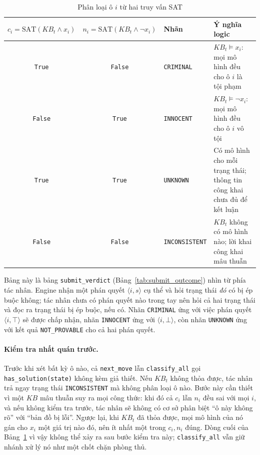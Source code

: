 \begin{sloppypar}
\begin{table}[htbp]
  \centering\small
  \caption{Phân loại ô $i$ từ hai truy vấn SAT}
  \label{tab:entailment_classification}
  \begin{tabularx}{\textwidth}{ccl>{\raggedright\arraybackslash}X}
    \toprule
    $c_i = \mathrm{SAT}(\mathit{KB}_t \land x_i)$
      & $n_i = \mathrm{SAT}(\mathit{KB}_t \land \neg x_i)$
      & \textbf{Nhãn} & \textbf{Ý nghĩa logic} \\
    \midrule
    \texttt{True}  & \texttt{False} & \texttt{CRIMINAL}
      & $\mathit{KB}_t \models x_i$: mọi mô hình đều cho ô $i$ là tội phạm \\
    \texttt{False} & \texttt{True}  & \texttt{INNOCENT}
      & $\mathit{KB}_t \models \neg x_i$: mọi mô hình đều cho ô $i$ vô tội \\
    \texttt{True}  & \texttt{True}  & \texttt{UNKNOWN}
      & Có mô hình cho mỗi trạng thái; thông tin công khai chưa đủ để kết luận \\
    \texttt{False} & \texttt{False} & \texttt{INCONSISTENT}
      & $\mathit{KB}_t$ không có mô hình nào; lời khai công khai mâu thuẫn \\
    \bottomrule
  \end{tabularx}
\end{table}

Bảng này là bảng \texttt{submit\_verdict} (Bảng~\ref{tab:submit_outcome}) nhìn
từ phía tác nhân. Engine nhận một phán quyết $\langle i, s\rangle$ cụ thể và
hỏi trạng thái \emph{đó} có bị ép buộc không; tác nhân chưa có phán quyết nào
trong tay nên hỏi cả hai trạng thái và đọc ra trạng thái bị ép buộc, nếu có.
Nhãn \texttt{CRIMINAL} ứng với việc phán quyết $\langle i, \top\rangle$ sẽ
được chấp nhận, nhãn \texttt{INNOCENT} ứng với $\langle i, \bot\rangle$, còn
nhãn \texttt{UNKNOWN} ứng với kết quả \texttt{NOT\_PROVABLE} cho cả hai phán
quyết.

\paragraph{Kiểm tra nhất quán trước.}
Trước khi xét bất kỳ ô nào, cả \texttt{next\_move} lẫn \texttt{classify\_all}
gọi \texttt{has\_solution(state)} không kèm giả thiết. Nếu $\mathit{KB}_t$
không thỏa được, tác nhân trả ngay trạng thái \texttt{INCONSISTENT} mà không
phân loại ô nào. Bước này cần thiết vì một $\mathit{KB}$ mâu thuẫn suy ra mọi
công thức: khi đó cả $c_i$ lẫn $n_i$ đều sai với mọi $i$, và nếu không kiểm
tra trước, tác nhân sẽ không có cơ sở phân biệt ``ô này không rõ'' với ``bản đồ
bị lỗi''. Ngược lại, khi $\mathit{KB}_t$ đã thỏa được, mọi mô hình của nó gán
cho $x_i$ một giá trị nào đó, nên ít nhất một trong $c_i, n_i$ đúng. Dòng cuối
của Bảng~\ref{tab:entailment_classification} vì vậy không thể xảy ra sau bước
kiểm tra này; \texttt{classify\_all} vẫn giữ nhánh xử lý nó như một chốt chặn
phòng thủ.


\end{sloppypar}
